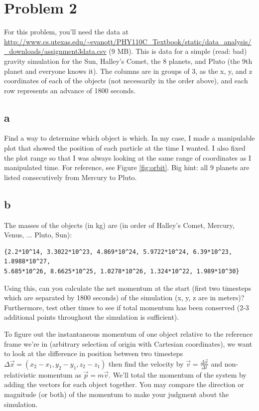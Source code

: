 \documentclass{article}
\begin{document}
\section{Problem 2}
For this problem, you'll need the data at \url{http://www.cs.utexas.edu/~evanott/PHY110C_Textbook/static/data_analysis/_downloads/assignment3data.csv} (9 MB). This is data
for a simple (read: bad) gravity simulation for the Sun, Halley's Comet, the 8 planets, and Pluto (the 9th planet and everyone knows it). The columns are in groups
of 3, as the x, y, and z coordinates of each of the objects (not necessarily in the order above), and each row represents an advance of 1800 seconds.

\subsection{a}
Find a way to determine which object is which. In my case, I made a manipulable plot that showed the position of each particle at the time I wanted. I also fixed the plot range so that
I was always looking at the same range of coordinates as I manipulated time. For reference, see Figure \ref{fig:orbit}. Big hint: all 9 planets are listed consecutively from Mercury to Pluto.

\subsection{b}
The masses of the objects (in kg) are (in order of Halley's Comet, Mercury, Venus, ... Pluto, Sun):

\begin{verbatim}
{2.2*10^14, 3.3022*10^23, 4.869*10^24, 5.9722*10^24, 6.39*10^23, 1.8988*10^27, 
5.685*10^26, 8.6625*10^25, 1.0278*10^26, 1.324*10^22, 1.989*10^30}
\end{verbatim}

Using this, can you calculate the net momentum at the start (first two timesteps which are separated by 1800 seconds) of the simulation (x, y, z are in meters)? Furthermore, test other times to see if total momentum has
been conserved (2-3 additional points throughout the simulation is sufficient). 

To figure out the instantaneous momentum of one object relative to the reference frame we're in (arbitrary
selection of origin with Cartesian coordinates), we want to look at the difference in position between two timesteps $\Delta{\vec{x}}=(x_2-x_1, y_2-y_1, z_2-z_1)$ then find the
velocity by $\vec{v}=\frac{\Delta{\vec{x}}}{\Delta{t}}$ and non-relativistic momentum as $\vec{p}=m\vec{v}$. We'll total the momentum of the system by adding the vectors for
each object together. You may compare the direction or magnitude (or both) of the momentum to make your judgment about the simulation.
\end{document}
